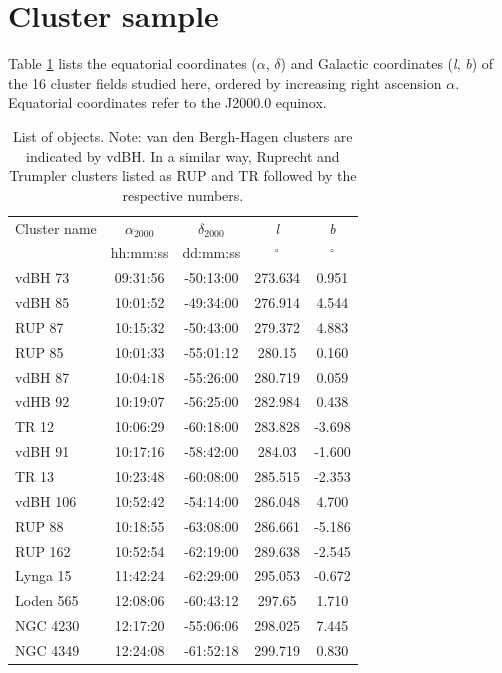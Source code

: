 \documentclass[draft]{aa}
\begin{document}
\section{Cluster sample}
\label{sec:clust_sample}

Table \ref{tab:clust_list} lists the equatorial coordinates ($\alpha$,
$\delta$) and Galactic coordinates (\textit{l}, \textit{b}) of the 16 cluster
fields studied here, ordered by increasing right ascension $\alpha$.
Equatorial coordinates refer to the J2000.0 equinox.

\begin{table}[ht]
    \centering
\caption{List of objects. Note: van den
Bergh-Hagen clusters \citep{vdBH1975} are indicated by vdBH. In a similar   
way, Ruprecht \citep{Ruprecht_1996} and Trumpler \citep{Trumpler_1930} clusters
listed as RUP and TR followed by the respective numbers.}
    \begin{tabular}{lcccc}
    \hline \hline 
        Cluster name & $\alpha_{2000}$ & $\delta_{2000}$ & \emph{l} & \emph{b}\\
         & hh:mm:ss & dd:mm:ss & $^\circ$ & $^\circ$\\
       \hline
        vdBH 73 & 09:31:56 & -50:13:00 & 273.634 & 0.951\\
        vdBH 85 & 10:01:52 & -49:34:00 & 276.914 & 4.544\\
        RUP 87 & 10:15:32 & -50:43:00 & 279.372 & 4.883\\
        RUP 85 & 10:01:33 & -55:01:12 & 280.15 & 0.160\\
        vdBH 87 & 10:04:18 & -55:26:00 & 280.719 & 0.059\\
        vdHB 92 & 10:19:07 & -56:25:00 & 282.984 & 0.438\\
        TR 12 & 10:06:29 & -60:18:00 & 283.828 & -3.698\\
        vdBH 91 & 10:17:16 & -58:42:00 & 284.03 & -1.600\\
        TR 13 & 10:23:48 & -60:08:00 & 285.515 & -2.353\\
        vdBH 106 & 10:52:42 & -54:14:00 & 286.048 & 4.700\\
        RUP 88 & 10:18:55 & -63:08:00 & 286.661 & -5.186\\
        RUP 162 & 10:52:54 & -62:19:00 & 289.638 & -2.545\\
        Lynga 15 & 11:42:24 & -62:29:00 & 295.053 & -0.672\\
        Loden 565 & 12:08:06 & -60:43:12 & 297.65 & 1.710\\
        NGC 4230 & 12:17:20 & -55:06:06 & 298.025 & 7.445\\
        NGC 4349 & 12:24:08 & -61:52:18 & 299.719 & 0.830\\
        \hline
    \end{tabular}
    \label{tab:clust_list}
\end{table}
\end{document}
